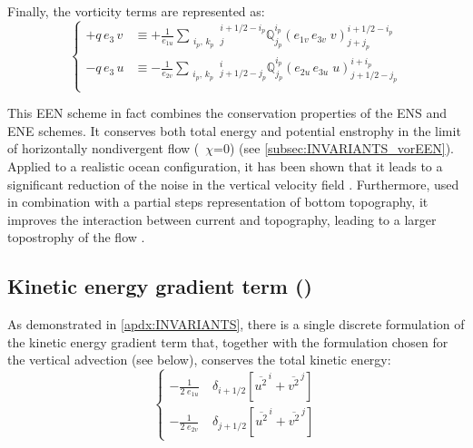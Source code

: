 \documentclass[../main/NEMO_manual]{subfiles}
\begin{document}
Finally, the vorticity terms are represented as:
\begin{equation}
  \label{eq:DYN_vor_een}
  \left\{ {
      \begin{aligned}
        +q\,e_3 \, v 	&\equiv +\frac{1}{e_{1u} }   \sum_{\substack{i_p,\,k_p}}
        {^{i+1/2-i_p}_j}  \mathbb{Q}^{i_p}_{j_p}  \left( e_{1v}\,e_{3v} \;v  \right)^{i+1/2-i_p}_{j+j_p}   \\
        - q\,e_3 \, u     &\equiv -\frac{1}{e_{2v} }    \sum_{\substack{i_p,\,k_p}}
        {^i_{j+1/2-j_p}}  \mathbb{Q}^{i_p}_{j_p}  \left( e_{2u}\,e_{3u} \;u  \right)^{i+i_p}_{j+1/2-j_p}   \\
      \end{aligned}
    } \right.
\end{equation}

This EEN scheme in fact combines the conservation properties of the ENS and ENE schemes.
It conserves both total energy and potential enstrophy in the limit of horizontally nondivergent flow
(\ie\ $\chi$=$0$) (see \autoref{subsec:INVARIANTS_vorEEN}).
Applied to a realistic ocean configuration, it has been shown that it leads to a significant reduction of
the noise in the vertical velocity field \citep{le-sommer.penduff.ea_OM09}.
Furthermore, used in combination with a partial steps representation of bottom topography,
it improves the interaction between current and topography,
leading to a larger topostrophy of the flow \citep{barnier.madec.ea_OD06, penduff.le-sommer.ea_OS07}.

\subsection[Kinetic energy gradient term (\textit{dynkeg.F90})]{Kinetic energy gradient term (\protect{})}
\label{subsec:DYN_keg}

As demonstrated in \autoref{apdx:INVARIANTS},
there is a single discrete formulation of the kinetic energy gradient term that,
together with the formulation chosen for the vertical advection (see below),
conserves the total kinetic energy:
\[
  \left\{
    \begin{aligned}
      -\frac{1}{2 \; e_{1u} }  & \ \delta_{i+1/2} \left[ {\overline {u^2}^{\,i} + \overline{v^2}^{\,j}} \right]   \\
      -\frac{1}{2 \; e_{2v} }  & \ \delta_{j+1/2} \left[ {\overline {u^2}^{\,i} + \overline{v^2}^{\,j}} \right]
    \end{aligned}
  \right.
\]
\end{document}
